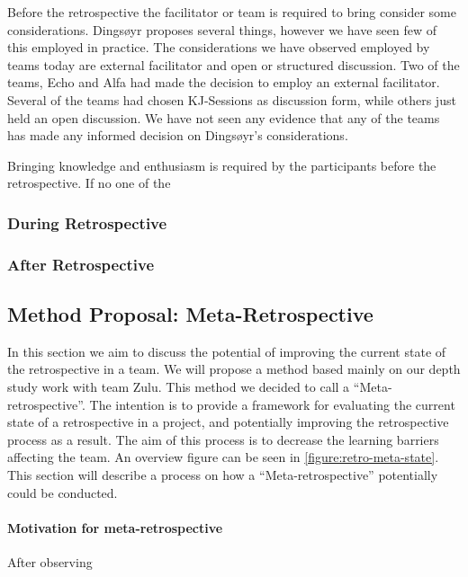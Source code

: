 Before the retrospective the facilitator or team is required to bring consider some considerations. Dingsøyr \cite{Dingsoyr2004} proposes several things, however we have seen few of this employed in practice. The considerations we have observed employed by teams today are external facilitator and open or structured discussion. Two of the teams, Echo and Alfa had made the decision to employ an external facilitator. Several of the teams had chosen KJ-Sessions as discussion form, while others just held an open discussion. We have not seen any evidence that any of the teams has made any informed decision on Dingsøyr's considerations. 

Bringing knowledge and enthusiasm is required by the participants before the retrospective. If no one of the 

\subsubsection{During Retrospective}

\subsubsection{After Retrospective}



\subsection{Method Proposal: Meta-Retrospective}
\label{section:Method-propsal}
In this section we aim to discuss the potential of improving the current state of the retrospective in a team. We will propose a method based mainly on our depth study work with team Zulu. This method we decided to call a ``Meta-retrospective''. The intention is to provide a framework for evaluating the current state of a retrospective in a project, and potentially improving the retrospective process as a result. The aim of this process is to decrease the learning barriers affecting the team. An overview figure can be seen in \autoref{figure:retro-meta-state}. This section will describe a process on how a ``Meta-retrospective'' potentially could be conducted.

\paragraph{Motivation for meta-retrospective}
After observing 


